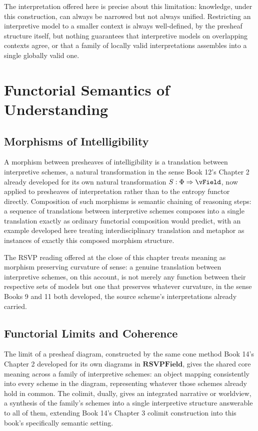 The interpretation offered here is precise about this limitation: knowledge, under this construction, can always be narrowed but not always unified. Restricting an interpretive model to a smaller context is always well-defined, by the presheaf structure itself, but nothing guarantees that interpretive models on overlapping contexts agree, or that a family of locally valid interpretations assembles into a single globally valid one.

\part{Functorial Semantics of Understanding}

\chapter{Morphisms of Intelligibility}

A morphism between presheaves of intelligibility is a translation between interpretive schemes, a natural transformation in the sense Book 12's Chapter 2 already developed for its own natural transformation $\SEntropy: \PhiField \Rightarrow \vField$, now applied to presheaves of interpretation rather than to the entropy functor directly. Composition of such morphisms is semantic chaining of reasoning steps: a sequence of translations between interpretive schemes composes into a single translation exactly as ordinary functorial composition would predict, with an example developed here treating interdisciplinary translation and metaphor as instances of exactly this composed morphism structure.

The RSVP reading offered at the close of this chapter treats meaning as morphism preserving curvature of sense: a genuine translation between interpretive schemes, on this account, is not merely any function between their respective sets of models but one that preserves whatever curvature, in the sense Books 9 and 11 both developed, the source scheme's interpretations already carried.

\chapter{Functorial Limits and Coherence}

The limit of a presheaf diagram, constructed by the same cone method Book 14's Chapter 2 developed for its own diagrams in $\mathbf{RSVPField}$, gives the shared core meaning across a family of interpretive schemes: an object mapping consistently into every scheme in the diagram, representing whatever those schemes already hold in common. The colimit, dually, gives an integrated narrative or worldview, a synthesis of the family's schemes into a single interpretive structure answerable to all of them, extending Book 14's Chapter 3 colimit construction into this book's specifically semantic setting.

